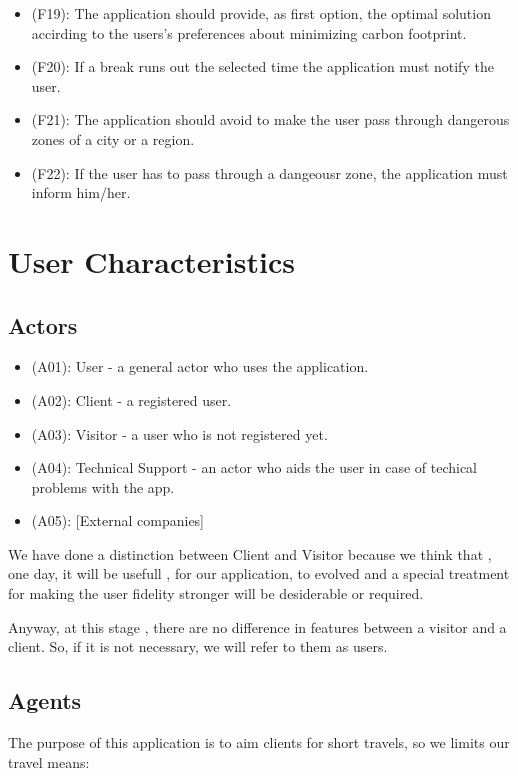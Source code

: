 \documentclass[a4paper,leqno]{book}
\begin{document}
\begin{itemize}
	\item (F19): The application should provide, as first option, the optimal solution accirding to the users's preferences about minimizing carbon footprint.
	\item (F20): If a break runs out the selected time the application must notify the user.
	\item (F21): The application should avoid to make the user pass through dangerous zones of a city or a region.
	\item (F22): If the user has to pass through a dangeousr zone, the application must inform him/her.
\end{itemize}

\section{User Characteristics}
\subsection{Actors}
\begin{itemize}
	\item (A01): User - a general actor who uses the application.
		\item (A02): Client - a registered user.
		\item (A03): Visitor - a user who is not registered yet.
	\item (A04): Technical Support - an actor who aids the user in case of techical problems with the app.
	\item (A05): [External companies]
\end{itemize}

We have done a distinction between Client and Visitor because we think that , one day, 
it will be usefull , for our application, to evolved and a special treatment for making the 
user fidelity stronger will be desiderable or required.

Anyway, at this stage , there are no difference in features between a visitor and a client. 
So, if it is not necessary, we will refer to them as users.

\subsection{Agents}

The purpose of this application is to aim clients for short travels, so we limits our travel means:
\end{document}
